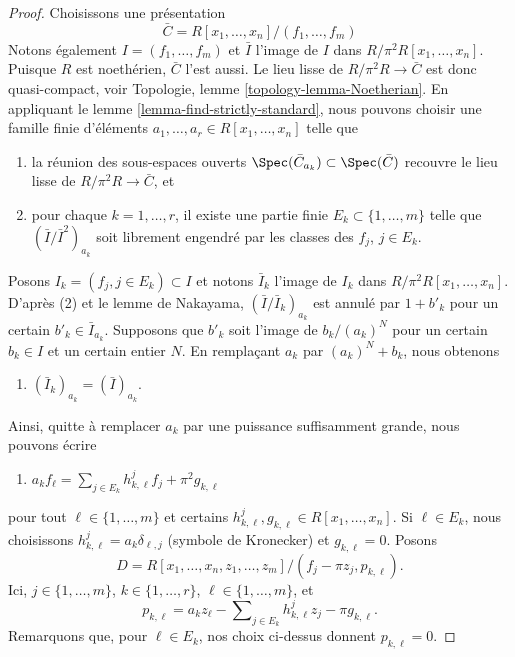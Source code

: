 \begin{proof}
Choisissons une présentation
$$
\bar C = R[x_1, \ldots, x_n]/(f_1, \ldots, f_m)
$$
Notons également $I = (f_1, \ldots, f_m)$ et $\bar I$ l'image de
$I$ dans $R/\pi^2R[x_1, \ldots, x_n]$. Puisque $R$ est noethérien,
$\bar C$ l'est aussi. Le lieu lisse de $R/\pi^2 R \to \bar C$
est donc quasi-compact, voir
Topologie, lemme \ref{topology-lemma-Noetherian}.
En appliquant le
lemme \ref{lemma-find-strictly-standard},
nous pouvons choisir une famille finie d'éléments
$a_1, \ldots, a_r \in R[x_1, \ldots, x_n]$ telle que
\begin{enumerate}
\item la réunion des sous-espaces ouverts
$\Spec(\bar C_{a_k}) \subset \Spec(\bar C)$
recouvre le lieu lisse de $R/\pi^2 R \to \bar C$, et
\item pour chaque $k = 1, \ldots, r$, il existe une partie finie
$E_k \subset \{1, \ldots, m\}$ telle que
$(\bar I/\bar I^2)_{a_k}$ soit librement engendré par les classes des
$f_j$, $j \in E_k$.
\end{enumerate}
Posons $I_k = (f_j, j \in E_k) \subset I$ et notons $\bar I_k$
l'image de $I_k$ dans $R/\pi^2R[x_1, \ldots, x_n]$.
D'après (2) et le lemme de Nakayama, $(\bar I/\bar I_k)_{a_k}$
est annulé par $1 + b'_k$ pour un certain $b'_k \in \bar I_{a_k}$.
Supposons que $b'_k$ soit l'image de $b_k/(a_k)^N$ pour un certain $b_k \in I$
et un certain entier $N$. En remplaçant $a_k$ par $(a_k)^N + b_k$, nous obtenons
\begin{enumerate}
\item[(3)] $(\bar I_k)_{a_k} = (\bar I)_{a_k}$.
\end{enumerate}
Ainsi, quitte à remplacer $a_k$ par une puissance suffisamment grande, nous pouvons écrire
\begin{enumerate}
\item[(4)]
$a_k f_\ell = \sum\nolimits_{j \in E_k} h_{k, \ell}^jf_j + \pi^2 g_{k, \ell}$
\end{enumerate}
pour tout $\ell \in \{1, \ldots, m\}$ et certains
$h_{k, \ell}^j, g_{k, \ell} \in R[x_1, \ldots, x_n]$.
Si $\ell \in E_k$, nous choisissons $h_{k, \ell}^j = a_k\delta_{\ell, j}$
(symbole de Kronecker) et $g_{k, \ell} = 0$. Posons
$$
D = R[x_1, \ldots, x_n, z_1, \ldots, z_m]/
(f_j - \pi z_j, p_{k, \ell}).
$$
Ici, $j \in \{1, \ldots, m\}$, $k \in \{1, \ldots, r\}$,
$\ell \in \{1, \ldots, m\}$, et
$$
p_{k, \ell} = a_k z_\ell - \sum\nolimits_{j \in E_k} h_{k, \ell}^j z_j
- \pi g_{k, \ell}.
$$
Remarquons que, pour $\ell \in E_k$, nos choix ci-dessus donnent $p_{k, \ell} = 0$.


\end{proof}
